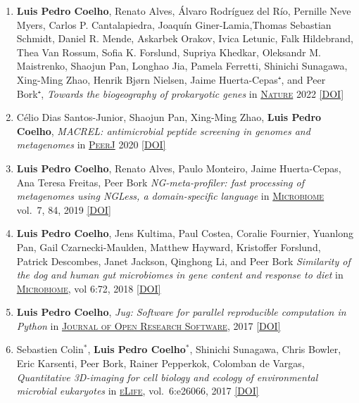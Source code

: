 \documentclass{article}
\newcommand\showdoi[1]{%
    \href{http://dx.doi.org/#1}{[DOI]}%
}
\newcommand\pubname[1]{\textsc{\uline{#1}}}
\newcommand\contribution[1]{\relax}
\newcommand\costar{${}^{*}$}
\begin{document}
\begin{enumerate}[resume]
\item \textbf{Luis Pedro Coelho}, Renato Alves, Álvaro Rodríguez del Río,
Pernille Neve Myers, Carlos P. Cantalapiedra, Joaquín Giner-Lamia,Thomas
Sebastian Schmidt, Daniel R. Mende, Askarbek Orakov, Ivica Letunic, Falk
Hildebrand, Thea Van Rossum, Sofia K. Forslund, Supriya Khedkar, Oleksandr M.
Maistrenko, Shaojun Pan, Longhao Jia, Pamela Ferretti, Shinichi Sunagawa,
Xing-Ming Zhao, Henrik Bjørn Nielsen, Jaime Huerta-Cepas⁺, and Peer Bork⁺,
\emph{Towards the biogeography of prokaryotic genes} in \pubname{Nature} 2022
\showdoi{10.1038/s41586-021-04233-4}

\item Célio Dias Santos-Junior, Shaojun Pan, Xing-Ming Zhao, \textbf{Luis Pedro
Coelho}, \emph{MACREL: antimicrobial peptide screening in genomes and
metagenomes} in \pubname{PeerJ} 2020 \showdoi{10.7717/peerj.10555}

\item \textbf{Luis Pedro Coelho}, Renato Alves, Paulo Monteiro, Jaime
Huerta-Cepas, Ana Teresa Freitas, Peer Bork \emph{NG-meta-profiler: fast
processing of metagenomes using NGLess, a domain-specific language} in
\pubname{Microbiome} vol.\ 7, 84, 2019 \showdoi{10.1186/s40168-019-0684-8}
\contribution{I conceived of the concept, co-wrote the software and the manuscript}

\item \textbf{Luis Pedro Coelho}, Jens Kultima, Paul Costea, Coralie Fournier,
Yuanlong Pan, Gail Czarnecki-Maulden, Matthew Hayward, Kristoffer Forslund,
Patrick Descombes, Janet Jackson, Qinghong Li, and Peer Bork \emph{Similarity
of the dog and human gut microbiomes in gene content and response to diet} in
\pubname{Microbiome}, vol 6:72, 2018 \showdoi{10.1186/s40168-018-0450-3}
\contribution{I designed and implemented the analysis strategy, wrote the first
version of the manuscript, and lead the subsequent incorporation of co-author
suggestions.}

\item \textbf{Luis Pedro Coelho}, \emph{Jug: Software for parallel reproducible
computation in Python} in \pubname{Journal of Open Research
Software}, 2017 \showdoi{10.5334/jors.161}
\contribution{I designed and implemented the software presented and wrote the
manuscript.}

\item Sebastien Colin\costar, \textbf{Luis Pedro Coelho}\costar, Shinichi
Sunagawa, Chris Bowler, Eric Karsenti, Peer Bork, Rainer Pepperkok, Colomban de
Vargas, \emph{Quantitative 3D-imaging for cell biology and ecology of
environmental microbial eukaryotes} in \pubname{eLife}, vol.\ 6:e26066, 2017
\showdoi{10.7554/eLife.26066.001}
\contribution{I designed and implemented the computational analysis necessary
for the method presented in the paper and participated in the writing of the
manuscript.}


\end{enumerate}
\end{document}

